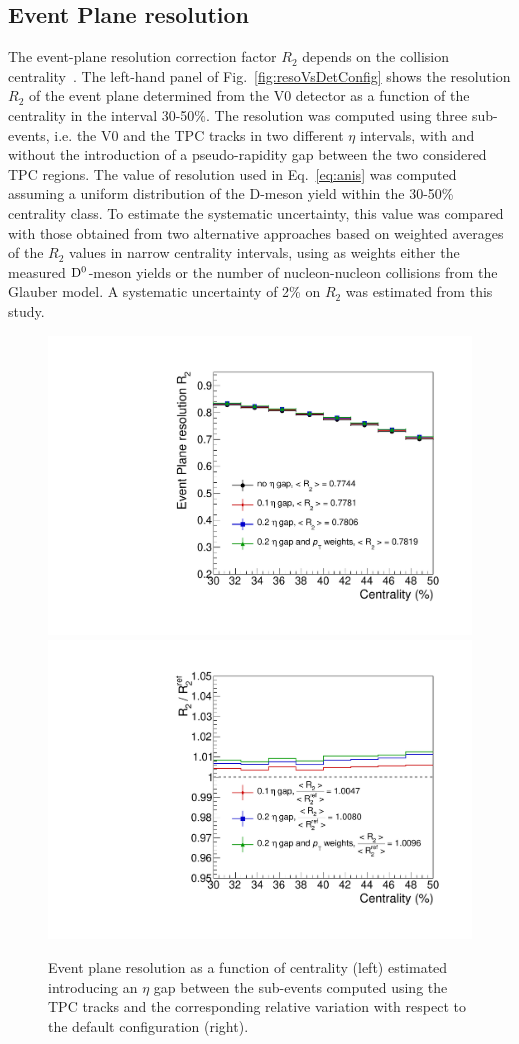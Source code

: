 \subsection{Event Plane resolution}
\label{sec:EPreso}
The event-plane resolution correction factor $R_2$ depends on the 
collision centrality~\cite{Abelev:2014ipa}. The left-hand panel of Fig.~\ref{fig:resoVsDetConfig} shows
the resolution $R_2$ of the event plane determined from the V0 detector as a function of the centrality in the interval
30-50\%. The resolution was computed using three sub-events, i.e. the
V0 and the TPC tracks in two different $\eta$ intervals,
with and without the introduction of a 
pseudo-rapidity gap between the two considered TPC regions.
The value of resolution used in Eq.~\ref{eq:anis} was computed
 assuming a uniform distribution of the D-meson yield within 
 the 30-50\% centrality class.
 To estimate the systematic uncertainty, this value was 
 compared with those obtained from two alternative approaches
based on weighted averages of the $R_2$ values in narrow centrality 
intervals, using as weights either the measured ${\rm D^0}$-meson yields or the number of 
nucleon-nucleon collisions from the Glauber model. 
A systematic uncertainty of 2\% on $R_2$ was estimated from 
this study.
\begin{figure}
\centering
  \includegraphics[width=.49\textwidth]{FigCap5/EPresolution_VZERO_NonFlowSyst.pdf}
  \includegraphics[width=.49\textwidth]{FigCap5/EPresolution_VZERO_NonFlowSyst_ratio.pdf}
\caption{Event plane resolution as a function of centrality (left) estimated introducing an $\eta$ gap between the sub-events computed using the TPC tracks and the corresponding relative variation with respect to the default configuration (right).}
\label{fig:EtaGapSyst}
\end{figure}

